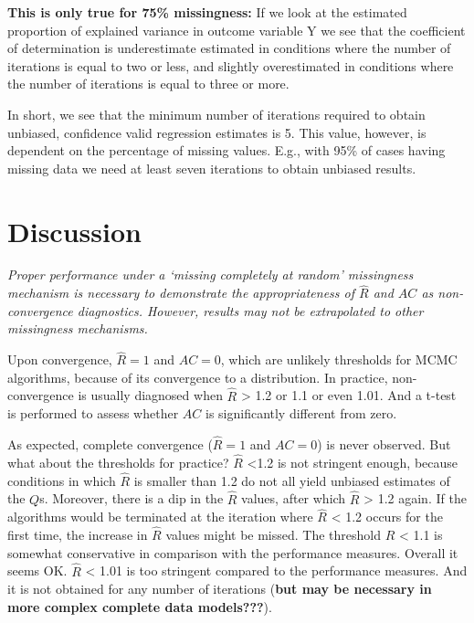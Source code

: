 \documentclass[Royal,times,sageh]{sagej}
\begin{document}
\textbf{This is only true for 75\% missingness:} If we look at the
estimated proportion of explained variance in outcome variable Y we see
that the coefficient of determination is underestimate estimated in
conditions where the number of iterations is equal to two or less, and
slightly overestimated in conditions where the number of iterations is
equal to three or more.

In short, we see that the minimum number of iterations required to
obtain unbiased, confidence valid regression estimates is 5. This value,
however, is dependent on the percentage of missing values. E.g., with
95\% of cases having missing data we need at least seven iterations to
obtain unbiased results.

\hypertarget{discussion}{%
\section{Discussion}\label{discussion}}

\emph{Proper performance under a `missing completely at random'
missingness mechanism is necessary to demonstrate the appropriateness of
\(\widehat{R}\) and \(AC\) as non-convergence diagnostics. However,
results may not be extrapolated to other missingness mechanisms.}

Upon convergence, \(\widehat{R}=1\) and \(AC=0\), which are unlikely
thresholds for MCMC algorithms, because of its convergence to a
distribution. In practice, non-convergence is usually diagnosed when
\(\widehat{R}\) \textgreater{} 1.2 or 1.1 or even 1.01. And a t-test is
performed to assess whether \(AC\) is significantly different from zero.

As expected, complete convergence (\(\widehat{R}=1\) and \(AC=0\)) is
never observed. But what about the thresholds for practice?
\(\widehat{R}\) \textless1.2 is not stringent enough, because conditions
in which \(\widehat{R}\) is smaller than 1.2 do not all yield unbiased
estimates of the \(Q\)s. Moreover, there is a dip in the \(\widehat{R}\)
values, after which \(\widehat{R}\) \textgreater{} 1.2 again. If the
algorithms would be terminated at the iteration where \(\widehat{R}\)
\textless{} 1.2 occurs for the first time, the increase in
\(\widehat{R}\) values might be missed. The threshold \(\widehat{R}\)
\textless{} 1.1 is somewhat conservative in comparison with the
performance measures. Overall it seems OK. \(\widehat{R}\) \textless{}
1.01 is too stringent compared to the performance measures. And it is
not obtained for any number of iterations (\textbf{but may be necessary
in more complex complete data models???}).
\end{document}
